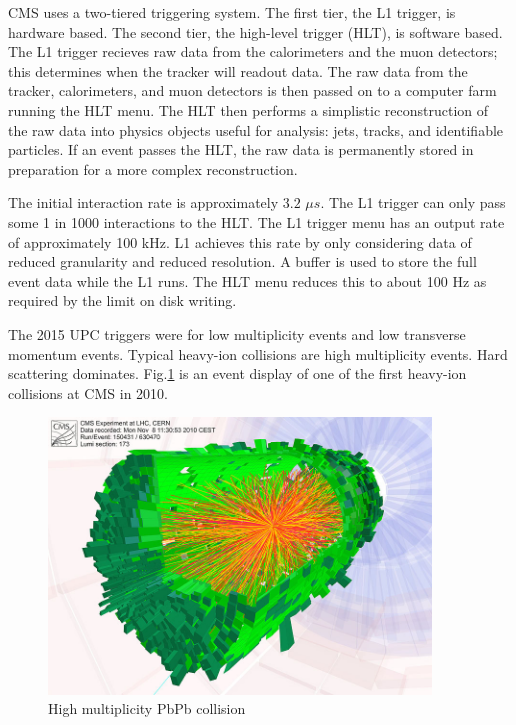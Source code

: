 CMS uses a two-tiered triggering system. The first tier, the L1 trigger, is hardware based. The second tier, the high-level trigger (HLT), is software based. The L1 trigger recieves raw data from the calorimeters and the muon detectors; this determines when the tracker will readout data. The raw data from the tracker, calorimeters, and muon detectors is then passed on to a computer farm running the HLT menu. The HLT then performs a simplistic reconstruction of the raw data into physics objects useful for analysis: jets, tracks, and identifiable particles. If an event passes the HLT, the raw data is permanently stored in preparation for a more complex reconstruction. 

The initial interaction rate is approximately $3.2$ $\mu s$. The L1 trigger can only pass some 1 in 1000 interactions to the HLT. The L1 trigger menu has an output rate of approximately 100 kHz. L1 achieves this rate by only considering data of reduced granularity and reduced resolution. A buffer is used to store the full event data while the L1 runs. The HLT menu reduces this to about 100 Hz as required by the limit on disk writing. 

The 2015 UPC triggers were for low multiplicity events and low transverse momentum events. Typical heavy-ion collisions are high multiplicity events. Hard scattering dominates. Fig.\ref{fig:eventdisplayHI} is an event display of one of the first heavy-ion collisions at CMS in 2010.

\begin{figure}[h!]
\begin{centering}
\includegraphics[width=4in]{Chapter3/importfigs/cms_firstleadcoll.jpg}
\par\end{centering}
\caption{High multiplicity PbPb collision \label{fig:eventdisplayHI}}
\end{figure}

